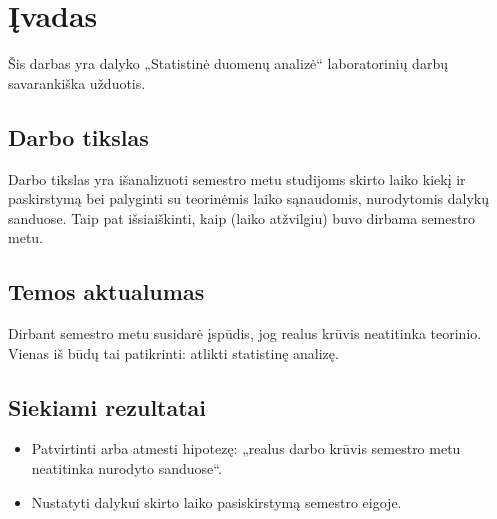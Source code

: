 \chapter{Įvadas}

Šis darbas yra dalyko „Statistinė duomenų analizė“ laboratorinių darbų
savarankiška užduotis.

\section{Darbo tikslas}

Darbo tikslas yra išanalizuoti semestro metu studijoms skirto laiko
kiekį ir paskirstymą bei palyginti su teorinėmis laiko sąnaudomis,
nurodytomis dalykų sanduose. Taip pat išsiaiškinti, kaip (laiko atžvilgiu)
buvo dirbama semestro metu.

\section{Temos aktualumas}

Dirbant semestro metu susidarė įspūdis, jog realus krūvis neatitinka
teorinio. Vienas iš būdų tai patikrinti: atlikti statistinę analizę.

\section{Siekiami rezultatai}

\begin{itemize}
  \item Patvirtinti arba atmesti hipotezę: „realus darbo krūvis
    semestro metu neatitinka nurodyto sanduose“.
  \item Nustatyti dalykui skirto laiko pasiskirstymą semestro eigoje.
\end{itemize}

